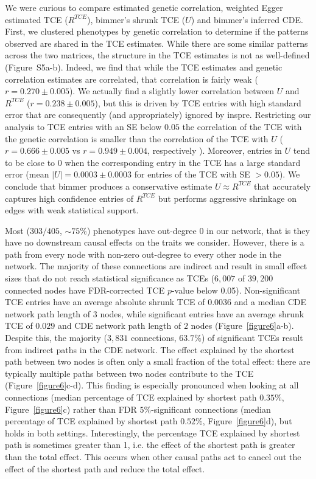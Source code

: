 \documentclass{article}
\begin{document}
We were curious to compare estimated
genetic correlation, weighted Egger estimated TCE ($R^{TCE}$), bimmer's
shrunk TCE ($U$) and bimmer's inferred CDE. First, we clustered phenotypes by genetic correlation
to determine if the patterns observed are shared in the TCE estimates.
While there are some similar patterns across the two matrices, the structure in the TCE estimates
is not as well-defined (Figure~S5a-b).
Indeed, we find that while the TCE estimates
and genetic correlation estimates are correlated, that correlation is fairly
weak ($r = 0.270\pm 0.005$). We actually find a slightly lower correlation between
 $U$ and $R^{TCE}$ ($r = 0.238 \pm 0.005$), but this is driven by TCE entries with high standard error that are consequently
(and appropriately) ignored by inspre. Restricting our analysis to TCE entries with an
SE below $0.05$ the correlation of the TCE with the genetic correlation is smaller
than the correlation of the TCE with $U$ ($r = 0.666 \pm 0.005$ vs $r = 0.949 \pm 0.004$, respectively ).
Moreover, entries in $U$ tend to be close to $0$ when the corresponding
entry in the TCE has a large standard error (mean ${|U|} = 0.0003 \pm 0.0003$ for entries of
the TCE with SE $> 0.05$). We conclude that bimmer produces a conservative
estimate $U \approx R^{TCE}$ that accurately captures high confidence
entries of $R^{TCE}$ but performs aggressive shrinkage on edges with weak statistical support. 

Most ($303/405$, $\sim 75\%$) phenotypes have out-degree $0$ in our network, that is they have no
downstream causal effects on the traits we consider. However, there is a path from every node with non-zero
out-degree to every other node in the network. The majority of these connections
are indirect and result in small effect sizes that do not reach
statistical significance as TCEs
($6,007$ of $39,200$ connected nodes have FDR-corrected TCE $p$-value below 0.05).
Non-significant TCE entries have an average absolute shrunk TCE of $0.0036$
and a median CDE network path length of $3$ nodes, while
significant entries have an average shrunk TCE of $0.029$ and CDE network path length of $2$ nodes
(Figure~\ref{figure6}a-b). Despite this, the majority
 ($3,831$ connections, $63.7\%$) of significant TCEs result from indirect paths in the CDE network.
The effect explained by the shortest path between two nodes is often only a small
fraction of the total effect: there are typically multiple paths
between two nodes contribute to the TCE (Figure~\ref{figure6}c-d). This finding is especially pronounced 
when looking at all connections (median percentage of TCE explained
by shortest path $0.35\%$, Figure~\ref{figure6}c) rather than FDR $5\%$-significant connections
(median percentage of TCE explained
by shortest path $0.52\%$, Figure~\ref{figure6}d), but holds in both settings.
Interestingly, the percentage TCE explained
by shortest path is sometimes greater than 1, i.e. the
effect of the shortest path is greater than the total effect. This occurs
when other causal paths act to cancel out the effect of the shortest path and reduce the total effect.
\end{document}
